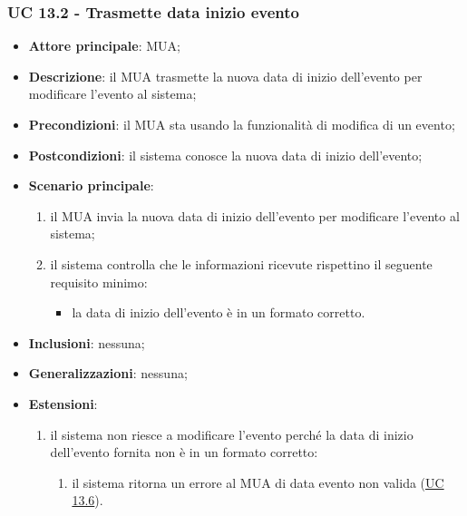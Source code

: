     \subsubsection{UC 13.2 - Trasmette data inizio evento} \label{sec:UC13.2}
    \begin{itemize}
        \item \textbf{Attore principale}: MUA;
        \item \textbf{Descrizione}: il MUA trasmette la nuova data di inizio dell'evento per modificare l'evento al sistema;
        \item \textbf{Precondizioni}: il MUA sta usando la funzionalità di modifica di un evento;
        \item \textbf{Postcondizioni}: il sistema conosce la nuova data di inizio dell'evento;
        \item \textbf{Scenario principale}:
            \begin{enumerate}
                \item il MUA invia la nuova data di inizio dell'evento per modificare l'evento al sistema;
                \item il sistema controlla che le informazioni ricevute rispettino il seguente requisito minimo:
                    \begin{itemize}
                        \item la data di inizio dell'evento è in un formato corretto.
                    \end{itemize}
            \end{enumerate}
        \item \textbf{Inclusioni}: nessuna;
        \item \textbf{Generalizzazioni}: nessuna;
        \item \textbf{Estensioni}:
            \begin{enumerate}[label=\alph*.]
                \item il sistema non riesce a modificare l'evento perché la data di inizio dell'evento fornita non è in un formato corretto:
                \begin{enumerate}[label=\arabic*.]
                    \item il sistema ritorna un errore al MUA di data evento non valida (\hyperref[sec:UC13.6]{UC 13.6}).
                \end{enumerate}
            \end{enumerate}
    \end{itemize}


